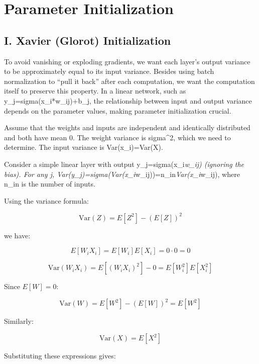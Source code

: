 \setcounter{section}{3}

\hypertarget{parameter-initialization}{%
\section{Parameter Initialization}\label{parameter-initialization}}

\hypertarget{i.-xavier-glorot-initialization}{%
\subsection{I. Xavier (Glorot) Initialization}\label{i.-xavier-glorot-initialization}}

To avoid vanishing or exploding gradients, we want each layer's output variance to be approximately equal to its input variance. Besides using batch normalization to ``pull it back'' after each computation, we want the computation itself to preserve this property. In a linear network, such as y\_j=sigma(x\_i*w\_ij)+b\_j, the relationship between input and output variance depends on the parameter values, making parameter initialization crucial.

Assume that the weights and inputs are independent and identically distributed and both have mean 0. The weight variance is sigma\^{}2, which we need to determine. The input variance is Var(x\_i)=Var(X).

Consider a simple linear layer with output y\_j=sigma(x\_i\emph{w\_ij) (ignoring the bias). For any j, Var(y\_j)=sigma(Var(x\_i}w\_ij))=n\_in\emph{Var(x\_i}w\_ij), where n\_in is the number of inputs.

Using the variance formula:

\[
\mathrm{Var}(Z)=E[Z^2]-(E[Z])^2
\]

we have:

\[
E[W_iX_i]=E[W_i]E[X_i]=0\cdot 0=0
\]

\[
\mathrm{Var}(W_iX_i)
=E[(W_iX_i)^2]-0
=E[W_i^2]E[X_i^2]
\]

Since \(E[W]=0\):

\[
\mathrm{Var}(W)=E[W^2]-(E[W])^2=E[W^2]
\]

Similarly:

\[
\mathrm{Var}(X)=E[X^2]
\]

Substituting these expressions gives:

